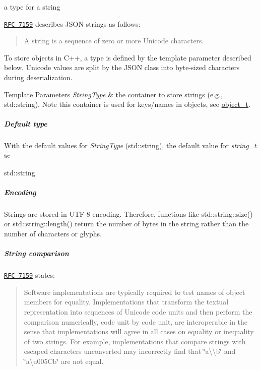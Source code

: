 a type for a string 

\href{http://rfc7159.net/rfc7159}{\tt R\+FC 7159} describes J\+S\+ON strings as follows\+: \begin{quote}
A string is a sequence of zero or more Unicode characters. \end{quote}


To store objects in C++, a type is defined by the template parameter described below. Unicode values are split by the J\+S\+ON class into byte-\/sized characters during deserialization.


\begin{DoxyTemplParams}{Template Parameters}
{\em String\+Type} & the container to store strings (e.\+g., {\ttfamily std\+::string}). Note this container is used for keys/names in objects, see \hyperlink{classnlohmann_1_1basic__json_a5e48a7893520e1314bf0c9723e26ea2a}{object\+\_\+t}.\\
\hline
\end{DoxyTemplParams}
\subparagraph*{Default type}

With the default values for {\itshape String\+Type} ({\ttfamily std\+::string}), the default value for {\itshape string\+\_\+t} is\+:


\begin{DoxyCode}
std::string
\end{DoxyCode}


\subparagraph*{Encoding}

Strings are stored in U\+T\+F-\/8 encoding. Therefore, functions like {\ttfamily std\+::string\+::size()} or {\ttfamily std\+::string\+::length()} return the number of bytes in the string rather than the number of characters or glyphs.

\subparagraph*{String comparison}

\href{http://rfc7159.net/rfc7159}{\tt R\+FC 7159} states\+: \begin{quote}
Software implementations are typically required to test names of object members for equality. Implementations that transform the textual representation into sequences of Unicode code units and then perform the comparison numerically, code unit by code unit, are interoperable in the sense that implementations will agree in all cases on equality or inequality of two strings. For example, implementations that compare strings with escaped characters unconverted may incorrectly find that {\ttfamily \char`\"{}a\textbackslash{}\textbackslash{}b\char`\"{}} and {\ttfamily \char`\"{}a\textbackslash{}u005\+Cb\char`\"{}} are not equal. \end{quote}



